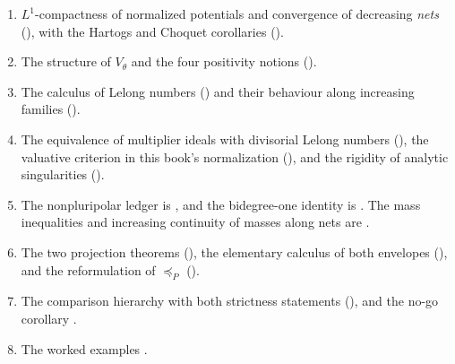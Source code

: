 \begin{enumerate}
\item\label{itm:ch51-exp:compactness}
      $L^1$-compactness of normalized potentials and convergence of
      decreasing \emph{nets}
      (), with the Hartogs and Choquet
      corollaries ().
\item\label{itm:ch51-exp:minimal}
      The structure of $V_\theta$ and the four positivity notions
      ().
\item\label{itm:ch51-exp:lelong}
      The calculus of Lelong numbers
      ()
      and their behaviour along increasing families
      ().
\item\label{itm:ch51-exp:ideals}
      The equivalence of multiplier ideals with divisorial Lelong numbers
      (), the valuative criterion in
      this book's normalization
      (), and the rigidity of
      analytic singularities ().
\item\label{itm:ch51-exp:npp}
      The nonpluripolar ledger is , and the
      bidegree-one identity is .  The mass
      inequalities and increasing continuity of masses along nets are
      .
\item\label{itm:ch51-exp:envelopes}
      The two projection theorems
      (), the
      elementary calculus of both envelopes
      (), and the
      reformulation of $\preceq_P$
      ().
\item\label{itm:ch51-exp:hierarchy}
      The comparison hierarchy with both strictness statements
      (), and the no-go corollary
      .
\item\label{itm:ch51-exp:examples}
      The worked examples
      .
\end{enumerate}

